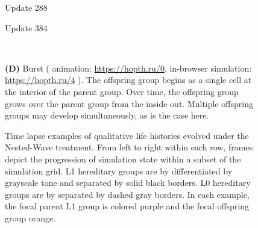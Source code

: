 \begin{figure*}[!htbp]
\begin{center}
\begin{minipage}[b]{\textwidth}
\begin{minipage}[t]{0.18\textwidth}
{\footnotesize Update 288}
\end{minipage}
\begin{minipage}[t]{0.18\textwidth}
\centering
{}
{\footnotesize Update 384}
\end{minipage}\\
\begin{minipage}{\textwidth}
\textbf{(D)} Burst
(%
animation: \url{https://hopth.ru/0},
in-browser simulation: \url{https://hopth.ru/4}%
).
The offspring group begins as a single cell at the interior of the parent group.
Over time, the offspring group grows over the parent group from the inside out.
Multiple offspring groups may develop simultaneously, as is the case here.
\end{minipage}
\end{minipage}

\caption{
Time lapse examples of qualitative life histories evolved under the Nested-Wave treatment.
From left to right within each row, frames depict the progression of simulation state within a subset of the simulation grid.
L1 hereditary groups are by differentiated by grayscale tone and separated by solid black borders.
L0 hereditary groups are by separated by dashed gray borders.
In each example, the focal parent L1 group is colored purple and the focal offspring group orange.
}
\label{fig:lifecycle}
\end{center}
\end{figure*}
